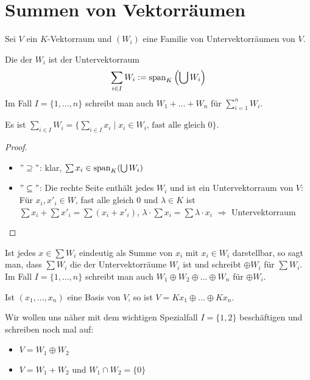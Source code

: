 \section{Summen von Vektorräumen}

Sei $V$ ein $K$-Vektorraum und $(W_i)$ eine Familie von Untervektorräumen von $V$.

\begin{definition}
	Die  der $W_i$ ist der Untervektorraum
	\begin{align}
		\sum_{i\in I} W_i := \operatorname{span}_K\left(\bigcup W_i\right)\notag
	\end{align} 
	Im Fall $I=\{1,...,n\}$ schreibt man auch $W_1+...+W_n$ für $\sum_{i=1}^n W_i$. 
\end{definition}

\begin{lemma}
	Es ist $\sum_{i\in I} W_i = \{\sum_{i\in I} x_i \mid x_i\in W_i\text{, fast alle 
		gleich 0}\}$. 
\end{lemma}
\begin{proof}
	\begin{itemize}
		\item $"\supseteq"$: klar, $\sum x_i \in \operatorname{span}_K(\bigcup W_i)$
		\item $"\subseteq"$: Die rechte Seite enthält jedes $W_i$ und ist ein Untervektorraum von $V$: \\
		Für $x_i,x'_i \in W$, fast alle gleich 0 und $\lambda \in K$ ist $\sum x_i + \sum x'_i = \sum (x_i+x'_i)$, $\lambda
		\cdot \sum x_i = \sum \lambda\cdot x_i$ $\Rightarrow$ Untervektorraum
	\end{itemize}
\end{proof}

\begin{definition}
	Ist jedes $x\in \sum W_i$ eindeutig als Summe von $x_i$ mit $x_i\in W_i$ 
	darstellbar, so sagt man, dass $\sum W_i$ die  der Untervektorräume $W_i$ ist und schreibt $\oplus W_i$ für 
	$\sum W_i$. Im Fall $I=\{1,...,n\}$ schreibt man auch $W_1\oplus W_2 \oplus ... \oplus W_n$ für $\oplus W_i$.
\end{definition}

\begin{example}
	Ist $(x_1,...,x_n)$ eine Basis von $V$, so ist $V=Kx_1\oplus ... \oplus Kx_n$. 
\end{example}

\begin{remark}
	Wir wollen uns näher mit dem wichtigen Spezialfall $I=\{1,2\}$ beschäftigen und schreiben noch 
	mal auf: 
	\begin{itemize}
		\item $V=W_1\oplus W_2$
		\item $V=W_1 + W_2$ und $W_1 \cap W_2 = \{0\}$
	\end{itemize}
\end{remark}

